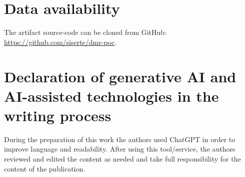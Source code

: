\documentclass[a4paper,fleqn]{cas-dc}
\begin{document}
\section*{Data availability}
The artifact source-code can be cloned from GitHub: \url{https://github.com/siserte/dmr-poc}.

\section*{Declaration of generative AI and AI-assisted technologies in the writing process}
During the preparation of this work the authors used ChatGPT in order to improve language and readability. After using this tool/service, the authors reviewed and edited the content as needed and take full responsibility for the content of the publication.





\end{document}
